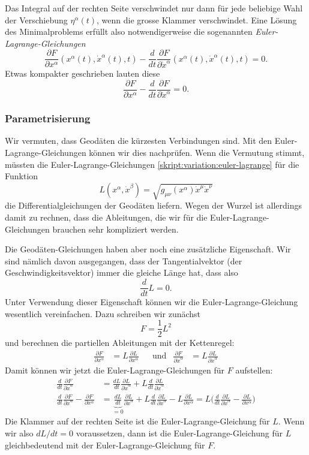 Das Integral auf der rechten Seite verschwindet nur dann für jede
beliebige Wahl der Verschiebung $\eta^\alpha(t)$, wenn die grosse Klammer
verschwindet.
Eine Lösung des Minimalproblems erfüllt also notwendigerweise die
sogenannten {\em Euler-Lagrange-Gleichungen}
\[
\frac{\partial F}{\partial x^\alpha}(x^\alpha(t), \dot x^\alpha(t), t)
-
\frac{d}{dt}\frac{\partial F}{\partial \dot x^\alpha}(x^\alpha(t), \dot x^\alpha(t), t)=0.
\]
Etwas kompakter geschrieben lauten diese
\begin{equation}
\frac{\partial F}{\partial x^\alpha}
-
\frac{d}{dt}\frac{\partial F}{\partial \dot x^\alpha}
=0.
\label{skript:variation:euler-lagrange}
\end{equation}

\subsubsection{Parametrisierung}
Wir vermuten, dass Geodäten die kürzesten Verbindungen sind.
Mit den Euler-Lagrange-Gleichungen können wir dies nachprüfen.
Wenn die Vermutung stimmt, müssten die Euler-Lagrange-Gleichungen 
\eqref{skript:variation:euler-lagrange}
für die Funktion
\[
L(x^\alpha, \dot x^\beta) =\sqrt{g_{\mu\nu}(x^\alpha)\dot x^\mu\dot x^\nu}
\]
die Differentialgleichungen der Geodäten liefern.
Wegen der Wurzel ist allerdings damit zu rechnen, dass die
Ableitungen, die wir für die Euler-Lagrange-Gleichungen brauchen sehr
kompliziert werden.

Die Geodäten-Gleichungen haben aber noch eine zusätzliche Eigenschaft.
Wir sind nämlich davon ausgegangen, dass der Tangentialvektor (der
Geschwindigkeitsvektor) immer die gleiche Länge hat, dass also
\[
\frac{d}{dt}L=0.
\]
Unter Verwendung dieser Eigenschaft können wir die Euler-Lagrange-Gleichung
wesentlich vereinfachen.
Dazu schreiben wir zunächst
\[
F=\frac12 L^2
\]
und berechnen die partiellen Ableitungen mit der Kettenregel:
\[
\begin{aligned}
\frac{\partial F}{\partial x^\alpha}
&=
L
\frac{\partial L}{\partial x^\alpha}
&&\text{und}
&
\frac{\partial F}{\partial \dot x^\alpha}
&=
L\frac{\partial L}{\partial\dot x^\alpha}
\end{aligned}
\]
Damit können wir jetzt die Euler-Lagrange-Gleichungen für $F$ aufstellen:
\begin{align*}
\frac{d}{dt}
\frac{\partial F}{\partial \dot x^\alpha}
&=
\frac{dL}{dt} \frac{\partial L}{\partial\dot x^\alpha}
+
L\frac{d}{dt}\frac{\partial L}{\partial\dot x^\alpha}
\\
\frac{d}{dt}
\frac{\partial F}{\partial \dot x^\alpha}
-
\frac{\partial F}{\partial x^\alpha}
&=
\underbrace{\frac{dL}{dt}}_{\displaystyle =0}
\frac{\partial L}{\partial\dot x^\alpha}
+
L\frac{d}{dt}\frac{\partial L}{\partial\dot x^\alpha}
-
L
\frac{\partial L}{\partial x^\alpha}
=
L\biggl(
\frac{d}{dt}\frac{\partial L}{\partial\dot x^\alpha}
-
\frac{\partial L}{\partial x^\alpha}
\biggr)
\end{align*}
Die Klammer auf der rechten Seite ist die Euler-Lagrange-Gleichung für
$L$.
Wenn wir also $dL/dt=0$ voraussetzen, dann ist die Euler-Lagrange-Gleichung
für $L$ gleichbedeutend mit der Euler-Lagrange-Gleichung für $F$.

